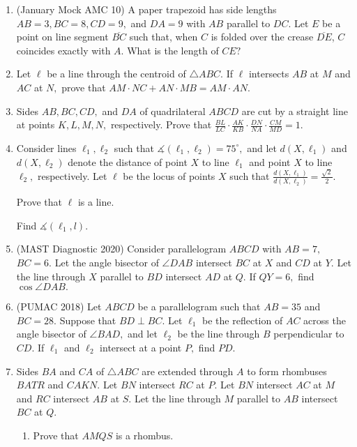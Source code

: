 \documentclass{article}
\begin{document}
\begin{enumerate}
    \item (January Mock AMC 10) A paper trapezoid has side lengths $AB = 3, BC = 8, CD = 9,$ and $DA = 9$ with $AB$ parallel to $DC$. Let $E$ be a point on line segment $\overline{BC}$ such that, when $C$ is folded over the crease $\overline{DE}$, $C$ coincides exactly with $A$. What is the length of $CE?$
    
    \item Let $\ell$ be a line through the centroid of $\triangle ABC.$ If $\ell$ intersects $AB$ at $M$ and $AC$ at $N,$ prove that $AM\cdot NC+AN\cdot MB=AM\cdot AN.$
    
    \item Sides $AB,BC,CD,$ and $DA$ of quadrilateral $ABCD$ are cut by a straight line at points $K,L,M,N,$ respectively. Prove that $\frac{BL}{LC}\cdot \frac{AK}{KB}\cdot \frac{DN}{NA}\cdot \frac{CM}{MD}=1.$
    
    \item Consider lines $\ell_1,\ell_2$ such that $\measuredangle(\ell_1,\ell_2)=75^{\circ},$ and let $d(X,\ell_1)$ and $d(X,\ell_2)$ denote the distance of point $X$ to line $\ell_1$ and point $X$ to line $\ell_2,$ respectively. Let $\ell$ be the locus of points $X$ such that $\frac{d(X,\ell_1)}{d(X,\ell_2)}=\frac{\sqrt{2}}{2}.$
    
    \begin{itemize}
        \Item Prove that $\ell$ is a line.
        
        \Item Find $\measuredangle(\ell_1,l).$
    \end{itemize}
    
    \item (MAST Diagnostic 2020) Consider parallelogram $ABCD$ with $AB=7,$ $BC=6.$ Let the angle bisector of $\angle DAB$ intersect $BC$ at $X$ and $CD$ at $Y.$ Let the line through $X$ parallel to $BD$ intersect $AD$ at $Q.$ If $QY=6,$ find $\cos\angle DAB.$
    
    \item (PUMAC 2018) Let $ABCD$ be a parallelogram such that $AB=35$ and $BC=28.$ Suppose that $BD\perp BC$. Let $\ell_1$ be the reflection of $AC$ across the angle bisector of $\angle BAD,$ and let $\ell_2$ be the line through $B$ perpendicular to $CD.$ If $\ell_1$ and $\ell_2$ intersect at a point $P,$ find $PD.$
    
    \item Sides $BA$ and $CA$ of $\triangle ABC$ are extended through $A$ to form rhombuses $BATR$ and $CAKN.$ Let $BN$ intersect $RC$ at $P.$ Let $BN$ intersect $AC$ at $M$ and $RC$ intersect $AB$ at $S.$ Let the line through $M$ parallel to $AB$ intersect $BC$ at $Q.$
    \begin{enumerate}
        \item Prove that $AMQS$ is a rhombus.
        

\end{enumerate}
\end{enumerate}
\end{document}
